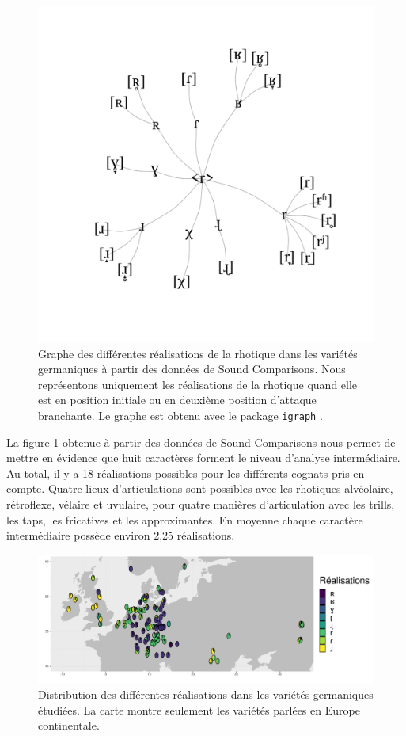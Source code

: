 \begin{figure}
	\centering
	\includegraphics[width=0.7\linewidth]{substance/images/germanic_rhotics}
	\caption[Graphe des différentes réalisations de la rhotique dans les variétés germaniques]{Graphe des différentes réalisations de la rhotique dans les variétés germaniques à partir des données de Sound Comparisons. Nous représentons uniquement les réalisations de la rhotique quand elle est en position initiale ou en deuxième position d'attaque branchante. Le graphe est obtenu avec le package \texttt{igraph} \parencite{csardiIgraphSoftwarePackage2006}.}
	\label{fig:germanicrhotics}
\end{figure}

La figure \ref{fig:germanicrhotics} obtenue à partir des données de Sound Comparisons nous permet de  mettre en évidence que huit caractères forment le niveau d'analyse intermédiaire. Au total, il y a 18 réalisations possibles pour les différents cognats pris en compte.
Quatre lieux d'articulations sont possibles avec les rhotiques alvéolaire, rétroflexe, vélaire et uvulaire, pour quatre manières d'articulation avec les trills, les taps, les fricatives et les approximantes.
En moyenne chaque caractère intermédiaire possède environ 2,25 réalisations.\\

\begin{figure}
	\centering
	\includegraphics[width=1\linewidth]{substance/images/productiongermanic_1_viridis}
	\caption[Distribution des différentes réalisations dans les variétés germaniques]{Distribution des différentes réalisations dans les variétés germaniques étudiées. La carte montre seulement les variétés parlées en Europe continentale.}
	\label{fig:productiongermanic1viridis}
\end{figure}

